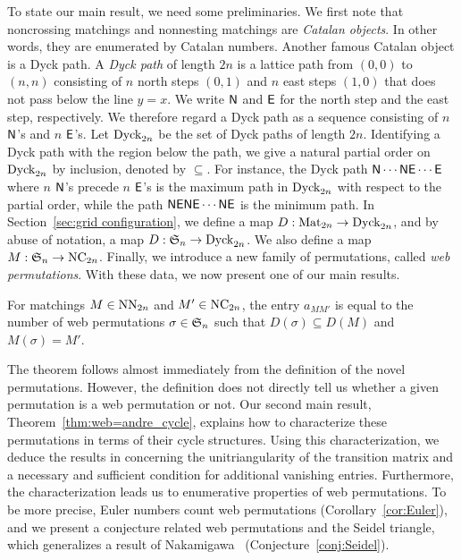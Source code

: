 To state our main result, we need some preliminaries.
We first note that noncrossing matchings and nonnesting matchings are \emph{Catalan objects}.
In other words, they are enumerated by Catalan numbers.
Another famous Catalan object is a Dyck path.
A \emph{Dyck path} of length \( 2n \)  is a lattice path from \( (0,0) \)
to \( (n,n) \) consisting of \( n \) north steps \( (0,1) \) and
\( n \) east steps \( (1,0) \) that does not pass below the line \( y=x \).
We write \( \mathsf{N} \) and \( \mathsf{E} \) for the north step and the east step,
respectively.
We therefore regard a Dyck path as a sequence consisting of
\( n \) \( \mathsf{N} \)'s and \( n \) \( \mathsf{E} \)'s.
Let \( \operatorname{Dyck}_{2n} \) be the set of Dyck paths of length \( 2n \).
Identifying a Dyck path with the region below the path,
we give a natural partial order on \( \operatorname{Dyck}_{2n} \) by inclusion,
denoted by \( \subseteq \).
For instance, the Dyck path \( \mathsf{N}\cdots\mathsf{N}\mathsf{E}\cdots\mathsf{E} \) where
\( n \) \( \mathsf{N} \)'s precede \( n \) \( \mathsf{E} \)'s is the maximum path
in \( \operatorname{Dyck}_{2n} \) with respect to the partial order,
while the path \( \mathsf{N}\mathsf{E}\mathsf{N}\mathsf{E}\cdots\mathsf{N}\mathsf{E} \) is the minimum path.
In Section~\ref{sec:grid configuration}, we define a map
\( D:\operatorname{Mat}_{2n}\rightarrow \operatorname{Dyck}_{2n} \), and by abuse of notation,
a map \( D:\mathfrak{S}_n\rightarrow \operatorname{Dyck}_{2n} \).
We also define a map \( M:\mathfrak{S}_n\rightarrow \operatorname{NC}_{2n} \).
Finally, we introduce a new family of permutations,
called \emph{web permutations}. With these data, we now present one of our main
results.
\begin{thm} \label{thm:main_intro}
  For matchings \( M\in\operatorname{NN}_{2n} \) and \( M'\in\operatorname{NC}_{2n} \),
  the entry \( a_{MM'} \) is equal to the number of web permutations
  \( \sigma\in\mathfrak{S}_n \) such that \( D(\sigma)\subseteq D(M) \) and \(M(\sigma)=M'\).
\end{thm}

The theorem follows almost immediately from the definition of the novel
permutations.
However, the definition does not directly tell us whether a given permutation
is a web permutation or not.
Our second main result, Theorem~\ref{thm:web=andre_cycle}, 
explains how to characterize these permutations in terms of their cycle structures.
Using this characterization, we deduce the results in \cite{RT19,IZ22}
concerning the unitriangularity of the transition matrix and a necessary
and sufficient condition for additional vanishing entries.
Furthermore, the characterization leads us to enumerative properties of web
permutations.
To be more precise, Euler numbers count web permutations (Corollary~\ref{cor:Euler}), and we present
a conjecture related web permutations and the Seidel triangle, which generalizes
a result of Nakamigawa~\cite{Nak20} (Conjecture~\ref{conj:Seidel}).

